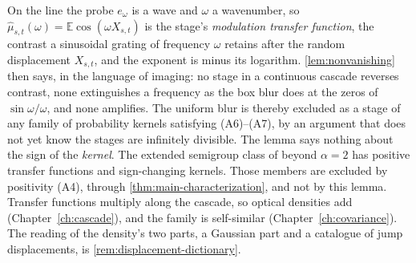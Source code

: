\begin{remark}\label{rem:modulation-transfer}
On the line the probe $e_\omega$ is a wave and $\omega$ a wavenumber, so
$\hat\mu_{s,t}(\omega) = \mathbb{E}\cos(\omega X_{s,t})$ is the stage's \emph{modulation
transfer function}, the contrast a sinusoidal grating of frequency $\omega$ retains after the
random displacement $X_{s,t}$, and the exponent is minus its logarithm.
\ref{lem:nonvanishing} then says, in the language of imaging: no stage in a continuous cascade
reverses contrast, none extinguishes a frequency as the box blur does at the zeros of
$\sin\omega/\omega$, and none amplifies. The uniform blur is thereby excluded as a stage of any
family of probability kernels satisfying (A6)--(A7), by an argument that does not yet know the
stages are infinitely divisible. The lemma says nothing about the sign of the \emph{kernel}. The
extended semigroup class of  beyond $\alpha = 2$ has positive
transfer functions and sign-changing kernels. Those members are excluded by positivity (A4),
through \ref{thm:main-characterization}, and not by this lemma.
Transfer functions multiply along the cascade, so optical densities add
(Chapter~\ref{ch:cascade}), and the family is self-similar
(Chapter~\ref{ch:covariance}). The reading of the density's two parts, a Gaussian part and a
catalogue of jump displacements, is \ref{rem:displacement-dictionary}.
\end{remark}

